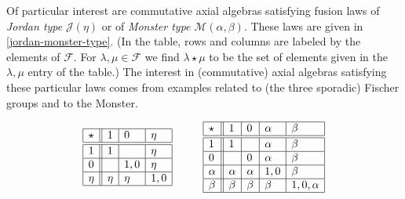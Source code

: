 \documentclass[oneside,a4paper]{amsart} %
\theoremstyle{definition}
\begin{document}
Of particular interest are commutative axial algebras satisfying fusion laws of \emph{Jordan type} $\mathcal{J}(\eta)$ 
or of \emph{Monster type} $\mathcal{M}(\alpha,\beta)$.
These laws are given in \cref{jordan-monster-type}. (In the table, rows and columns are labeled by the elements of $\mathcal{F}$.
For $\lambda, \mu\in \mathcal{F}$ we find $\lambda\star \mu$ to be the set of elements given in the $\lambda,\mu$ entry of the table.)
The  interest in (commutative) axial algebras satisfying these particular laws  comes from examples related  to (the three sporadic) Fischer groups and to the Monster.
\begin{table}
$$\begin{array}{|l||l|l|l|}
\hline
\star & 1 &  0 &\eta\\
\hline\hline
1& 1&  & \eta\\
\hline
0&  & 1,0 & \eta\\
\hline
\eta &\eta& \eta  & 1,0 \\
\hline
\end{array}
\hspace{1cm}\begin{array}{|l||l|l|l|l|}
\hline
\star & 1 & 0& \alpha &\beta\\
\hline\hline
1& 1& &\alpha & \beta\\
\hline
0    &  & 0& \alpha & \beta\\
\hline
\alpha& \alpha &\alpha&  1,0& \beta\\
\hline
\beta &\beta& \beta &\beta& 1,0,\alpha \\
\hline
\end{array}
$$ 
\caption{Fusion laws of type $\mathcal{J}(\eta)$ %
and  $\mathcal{M}(\alpha,\beta)$}
\label{jordan-monster-type}
\end{table}
\end{document}
